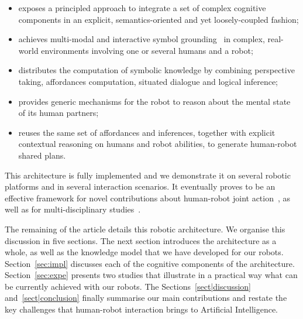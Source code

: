 \documentclass[preprint,3p,times]{elsarticle}
\begin{document}
\begin{itemize}
    \item exposes a principled approach to integrate a set of complex cognitive
        components in an explicit, semantics-oriented and yet loosely-coupled
        fashion;

    \item achieves multi-modal and interactive symbol
        grounding~\cite{Harnad1990} in complex, real-world environments involving one or
        several humans and a robot;

    \item distributes the computation of symbolic knowledge by combining perspective taking,
        affordances computation, situated dialogue and logical inference;

    \item provides generic mechanisms for the robot to reason about the mental state
        of its human partners;

    \item reuses the same set of affordances and inferences, together with
        explicit contextual reasoning on humans and robot abilities, to generate
        human-robot shared plans.

\end{itemize}

This architecture is fully implemented and we demonstrate it on several robotic
platforms and in several interaction scenarios. It eventually proves to be an
effective framework for novel contributions about human-robot joint
action~\cite{fiore2016planning,devin2016implemented,milliez2016using}, as well
as for multi-disciplinary
studies~\cite{dautenhahn2006may,koay2007exploratory,Ros2010b,dehais2011physiological,ferreira2015users,GharbiROMAN2015}.

\vspace{0.5cm} The remaining of the article details this robotic architecture.
We organise this discussion in five sections. The next section introduces the
architecture as a whole, as well as the knowledge model that we have developed
for our robots. Section~\ref{sec:impl} discusses each of the cognitive
components of the architecture.  Section~\ref{sec:expe} presents two studies
that illustrate in a practical way what can be currently achieved with our
robots.  The Sections~\ref{sect|discussion} and~\ref{sect|conclusion} finally
summarise our main contributions and restate the key challenges that human-robot
interaction brings to Artificial Intelligence.
\end{document}
